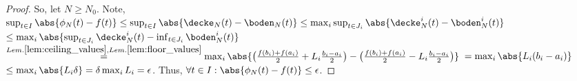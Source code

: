 \begin{thm}
\begin{proof}
So, let $N \geq N_0$. 
Note, $\sup_{ t \in I} \abs{\phi_N(t) - f(t)} \leq \sup_{ t \in I} \abs{\decke_N(t) - \boden_N (t)} \leq \max_{i} \sup_{ t \in J_i} \abs{\decke_N^i(t) - \boden_N^i (t)}$
$\leq \max_{i}  \abs{\sup_{ t \in J_i}\decke_N^i(t) - \inf_{ t \in J_i} \boden_N^i (t)}$
$\stackrel{Lem. \ref{lem:ceiling_values}, Lem. \ref{lem:floor_values}}{=} \max_i \abs{ \bigl(\frac{f(b_i) +f(a_i)}{2} + L_i \frac{b_i-a_i}{2}  \bigr)- \bigl(\frac{f(b_i) +f(a_i)}{2} - L_i \frac{b_i-a_i}{2} \bigr)}$
$=\max_i \abs{ L_i (b_i-a_i) }$
$\leq \max_i \abs{ L_i \delta } = \delta \max_i L_i = \epsilon$.
Thus, $\forall t \in I: \abs{\phi_N(t) - f(t)} \leq \epsilon$.

\end{proof}

\end{thm}
